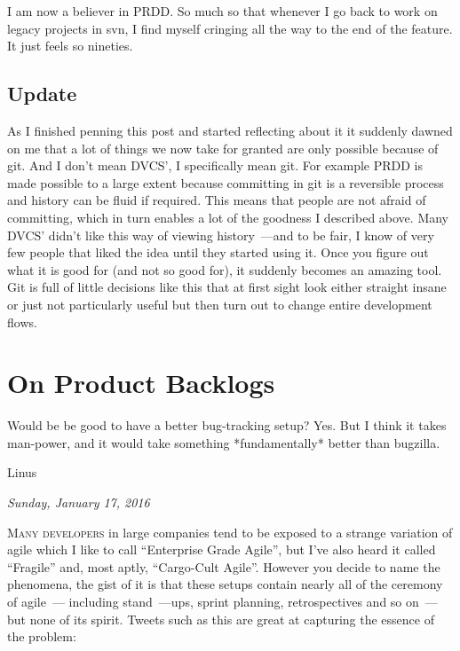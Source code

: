 \documentclass{book}
\begin{document}
I am now a believer in PRDD. So much so that whenever I go back to
work on legacy projects in svn, I find myself cringing all the way to
the end of the feature. It just feels so nineties.

\section*{Update}

As I finished penning this post and started reflecting about it it
suddenly dawned on me that a lot of things we now take for granted are
only possible because of git. And I don't mean DVCS', I specifically
mean git. For example PRDD is made possible to a large extent because
committing in git is a reversible process and history can be fluid if
required. This means that people are not afraid of committing, which
in turn enables a lot of the goodness I described above. Many DVCS'
didn't like this way of viewing history~---and to be fair, I know of
very few people that liked the idea until they started using it. Once
you figure out what it is good for (and not so good for), it suddenly
becomes an amazing tool. Git is full of little decisions like this
that at first sight look either straight insane or just not
particularly useful but then turn out to change entire development
flows.

\chapter{On Product Backlogs}

\epigraph{Would be be good to have a better bug-tracking setup? Yes.
  But I think it takes man-power, and it would take something
  *fundamentally* better than bugzilla.}{Linus}

\begin{flushright}
  \emph{Sunday, January 17, 2016}
\end{flushright}

\lettrine{M}{any developers} in large companies tend to be exposed to
a strange variation of agile which I like to call ``Enterprise Grade
Agile'', but I've also heard it called ``Fragile'' and, most aptly,
``Cargo-Cult Agile''. However you decide to name the phenomena, the
gist of it is that these setups contain nearly all of the ceremony of
agile~--- including stand~---ups, sprint planning, retrospectives and
so on~--- but none of its spirit. Tweets such as this are great at
capturing the essence of the problem:
\end{document}
